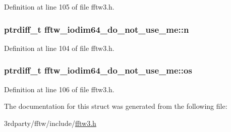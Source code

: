 \-Definition at line 105 of file fftw3.\-h.

\hypertarget{structfftw__iodim64__do__not__use__me_a19f8739d839b44db63c3aa1696a3a038}{
\subsubsection[{n}]{\setlength{\rightskip}{0pt plus 5cm}ptrdiff\-\_\-t {\bf fftw\-\_\-iodim64\-\_\-do\-\_\-not\-\_\-use\-\_\-me\-::n}}}\label{d5/d92/structfftw__iodim64__do__not__use__me_a19f8739d839b44db63c3aa1696a3a038}


\-Definition at line 104 of file fftw3.\-h.

\hypertarget{structfftw__iodim64__do__not__use__me_a44118d774124bdaa670f640537b151cf}{
\subsubsection[{os}]{\setlength{\rightskip}{0pt plus 5cm}ptrdiff\-\_\-t {\bf fftw\-\_\-iodim64\-\_\-do\-\_\-not\-\_\-use\-\_\-me\-::os}}}\label{d5/d92/structfftw__iodim64__do__not__use__me_a44118d774124bdaa670f640537b151cf}


\-Definition at line 106 of file fftw3.\-h.



\-The documentation for this struct was generated from the following file\-:\begin{DoxyCompactItemize}
\item 
3rdparty/fftw/include/\hyperlink{fftw3_8h}{fftw3.\-h}\end{DoxyCompactItemize}
